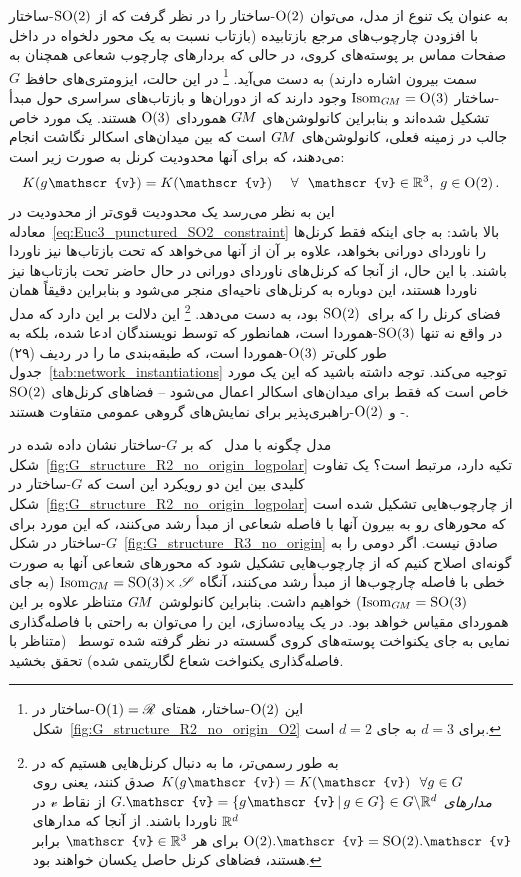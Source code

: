 به عنوان یک تنوع از مدل، می‌توان $\operatorname{O}(2)$-ساختار را در نظر گرفت که از $\operatorname{SO}(2)$-ساختار با افزودن چارچوب‌های مرجع بازتابیده (بازتاب نسبت به یک محور دلخواه در داخل صفحات مماس بر پوسته‌های کروی، در حالی که بردارهای چارچوب شعاعی همچنان به سمت بیرون اشاره دارند) به دست می‌آید.%
\footnote{
	این $\operatorname{O}(2)$-ساختار، همتای $\operatorname{O}(1) = \mathscr{R}$-ساختار در شکل~\ref{fig:G_structure_R2_no_origin_O2} برای $d=3$ به جای $d=2$ است.
}
در این حالت، ایزومتری‌های حافظ $G$-ساختار $\operatorname{Isom}_{G\mkern-1.4muM} = \operatorname{O}(3)$ وجود دارند که از دوران‌ها و بازتاب‌های سراسری حول مبدأ تشکیل شده‌اند و بنابراین کانولوشن‌های $G\mkern-1.4muM$ هموردای $\operatorname{O}(3)$ هستند.
یک مورد خاص جالب در زمینه فعلی، کانولوشن‌های $G\mkern-1.4muM$ است که بین میدان‌های اسکالر نگاشت انجام می‌دهند، که برای آنها محدودیت کرنل به صورت زیر است:
\begin{align}\label{eq:Euc3_punctured_O2_constraint}
	K(g\mkern1mu \mathscr{v}) = K(\mathscr{v}) \quad\ \forall\ \ \mathscr{v}\in\R^3,\ g\in\OO2 \,.
\end{align}
این به نظر می‌رسد یک محدودیت قوی‌تر از محدودیت در معادله~\eqref{eq:Euc3_punctured_SO2_constraint} بالا باشد:
به جای اینکه فقط کرنل‌ها را ناوردای دورانی بخواهد، علاوه بر آن از آنها می‌خواهد که تحت بازتاب‌ها نیز ناوردا باشند.
با این حال، از آنجا که کرنل‌های ناوردای دورانی در حال حاضر تحت بازتاب‌ها نیز ناوردا هستند، این دوباره به کرنل‌های ناحیه‌ای منجر می‌شود و بنابراین دقیقاً همان فضای کرنل را که برای~$\operatorname{SO}(2)$ بود، به دست می‌دهد.%
\footnote{
	به طور رسمی‌تر، ما به دنبال کرنل‌هایی هستیم که در $K(g\mkern1mu \mathscr{v}) = K(\mathscr{v})\ \ \forall g\in G$ صدق کنند، یعنی روی \emph{مدارهای} $G.\mathscr{v} = \{g\mkern1mu \mathscr{v} \,|\, g\in G\} \in G \backslash \R^d$ از نقاط $\mathscr{v}$ در $\mathbb{R}^d$ ناوردا باشند.
	از آنجا که مدارهای $\OO2.\mathscr{v} = \SO2.\mathscr{v}$ برای هر $\mathscr{v}\in\R^3$ برابر هستند، فضاهای کرنل حاصل یکسان خواهند بود.
}
این دلالت بر این دارد که مدل \citet{ramasinghe2019representation} در واقع نه تنها $\operatorname{SO}(3)$-هموردا است، همانطور که توسط نویسندگان ادعا شده، بلکه به طور کلی‌تر $\operatorname{O}(3)$-هموردا است، که طبقه‌بندی ما را در ردیف (۲۹) جدول~\ref{tab:network_instantiations} توجیه می‌کند.
توجه داشته باشید که این یک مورد خاص است که فقط برای میدان‌های اسکالر اعمال می‌شود -- فضاهای کرنل‌های $\operatorname{SO}(2)$- و $\operatorname{O}(2)$-راهبری‌پذیر برای نمایش‌های گروهی عمومی متفاوت هستند.


مدل \citet{ramasinghe2019representation} چگونه با مدل~\citet{esteves2017polar} که بر $G$-ساختار نشان داده شده در شکل~\ref{fig:G_structure_R2_no_origin_logpolar} تکیه دارد، مرتبط است؟
یک تفاوت کلیدی بین این دو رویکرد این است که $G$-ساختار در شکل~\ref{fig:G_structure_R2_no_origin_logpolar} از چارچوب‌هایی تشکیل شده است که محورهای رو به بیرون آنها با فاصله شعاعی از مبدأ رشد می‌کنند، که این مورد برای $G$-ساختار در شکل~\ref{fig:G_structure_R3_no_origin} صادق نیست.
اگر دومی را به گونه‌ای اصلاح کنیم که از چارچوب‌هایی تشکیل شود که محورهای شعاعی آنها به صورت خطی با فاصله چارچوب‌ها از مبدأ رشد می‌کنند، آنگاه $\operatorname{Isom}_{G\mkern-1.4muM} = \operatorname{SO}(3) \!\times \mathscr{S}$ (به جای $\operatorname{Isom}_{G\mkern-1.4muM} = \operatorname{SO}(3)$) خواهیم داشت.
بنابراین کانولوشن $G\mkern-1.4muM$ متناظر علاوه بر این هموردای مقیاس خواهد بود.
در یک پیاده‌سازی، این را می‌توان به راحتی با فاصله‌گذاری نمایی به جای یکنواخت پوسته‌های کروی گسسته در نظر گرفته شده توسط~\citet{ramasinghe2019representation} (متناظر با فاصله‌گذاری یکنواخت شعاع لگاریتمی شده) تحقق بخشید.


